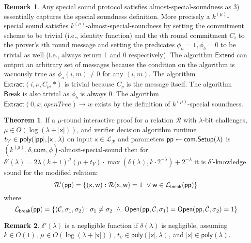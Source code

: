 \documentclass{article}
\theoremstyle{definition}
\newtheorem{theorem}{Theorem}
\newtheorem{remark}{Remark}
\newcommand{\benedikt}[1]{{\textcolor{blue}{[\bf Benedikt: #1]}}}
\begin{document}
\begin{remark} Any special sound protocol satisfies almost-special-soundness as 3) essentially captures the special soundness definition. More precisely a $k^{(\mu)}$-special sound satisfies $k^{(\mu)}$-almost-special-soundness by setting the commitment scheme to be trivial (i.e., identity function) and the $i$th round commitment $C_i$ to the prover's $i$th round message and setting the predicates $\phi_a=1, \phi_b=0$ to be trivial as well (i.e., always return 1 and 0 respectively). The algorithm $\textsf{Extend}$ can output an arbitrary set of messages because the condition on the algorithm is vacuously true as $\phi_a(i,m) \neq 0$ for any $(i,m)$. The algorithm $\textsf{Extract}(i, \nu, C_\nu, *)$ is trivial because $C_\nu$ is the message itself. The algorithm $\textsf{Break}$ is also trivial as $\phi_b$ is always $0$. The algorithm $\textsf{Extract}(0, x, openTree) \rightarrow w$ exists by the definition of $k^{(\mu)}$-special soundness. %
\end{remark}



\begin{theorem}\label{thm:DARKExtractor} If a $\mu$-round interactive proof for a relation $\mathcal{R}$ with $\lambda$-bit challenges, $\mu \in O(\log(\lambda + |\mathsf{x}|))$, and verifier decision algorithm runtime $t_V \in \textsf{poly}(|\textsf{pp}|, |\mathsf{x}|, \lambda)$ on input $\mathsf{x} \in \mathcal{L}_\mathcal{R}$ and parameters $\textsf{pp} \gets \textsf{com}.\textsf{{Setup}}(\lambda)$ is $(k^{(\mu)}, \delta, \textsf{com}, \phi)$-almost-special-sound then for $\delta'(\lambda) = 2\lambda (k+1)^\mu (\mu + t_V) \cdot \max(\delta(\lambda), k \cdot 2^{-\lambda}) + 2^{-\lambda}$ it is $\delta'$-knowledge sound for the modified relation:
$$\mathcal{R'}(\textsf{pp}) = \{(\mathsf{x}, \mathsf{w}): \mathcal{R}(\mathsf{x}, \mathsf{w}) = 1 \  \vee \mathsf{w} \in \mathcal{L}_\textsf{break}(\textsf{pp})\} $$
 where 
 $$\mathcal{L}_\textsf{break}(\crs) = \{ (\mathcal{C}, \sigma_1, \sigma_2) :   \sigma_1 \neq \sigma_2 \ \wedge \ \open(\crs,\mathcal{C}, \sigma_1) = \open(\crs,\mathcal{C}, \sigma_2) = 1    \} $$ 

\end{theorem} 
\begin{remark} $\delta'(\lambda)$ is a negligible function if $\delta(\lambda)$ is negligible, assuming $k \in O(1)$, $\mu \in O(\log(\lambda + |\mathsf{x}|))$, $t_V \in \textsf{poly}(|\mathsf{x}|, \lambda)$, and $|\mathsf{x}| \in \textsf{poly}(\lambda)$. 	
\end{remark}
\end{document}
